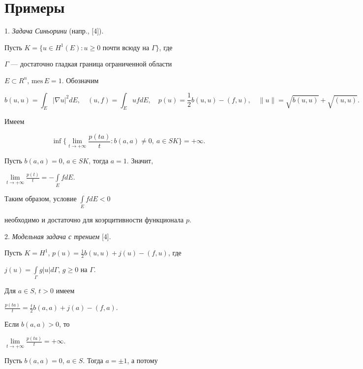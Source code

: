 \section*{Примеры}





1. {\it Задача Синьорини} (напр., [4]).


Пусть $K=\{ u \in H^1(E) : u \geq 0$ почти всюду на $\Gamma\}$, где


$\Gamma$ --- достаточно гладкая граница ограниченной области 


$E \subset R^n$, $\mathrm{mes}\,E=1$. Обозначим


$$


b(u,u)=\int_E|\nabla u|^2dE, \quad


(u,f) =\int_EufdE,\quad


p(u)=\frac{1}{2} b(u,u) -(f,u), \quad


\|u\|=\sqrt{b(u,u)}+\sqrt{(u,u)}.


$$


Имеем


$$


\inf\bigg\{ \lim_{t \to +\infty}\frac{p(ta)}{t}:


b(a,a) \ne 0, \ a \in SK\bigg\}= +\infty.


$$


Пусть $b(a,a)=0$, $a \in SK$, тогда $a=1$. Значит,


$\lim\limits_{t \to +\infty}\frac{p(t)}{t}=-\int\limits_EfdE$.


Таким образом, условие $\int\limits_EfdE < 0$


необходимо и достаточно для коэрцитивности функционала $p$.


\smallskip





2. {\it Модельная задача с трением} [4].


Пусть $K=H^1$, $p(u)=\frac12 b(u,u) + j(u) - (f,u)$, где


$j(u)=\int\limits_\Gamma g|u|d\Gamma$, $g \ge 0$ на $\Gamma$.


Для $a \in S$, $t > 0$ имеем


$\frac{p(ta)}{t} = \frac {t}{2} b(a,a) + j(a) - (f,a)$.


Если $b(a,a)>0$, то


$\lim\limits_{t \to +\infty}\frac{p(ta)}{t} = +\infty$.


Пусть $b(a,a)=0$, $a \in S$. Тогда $a= \pm 1$, а потому


